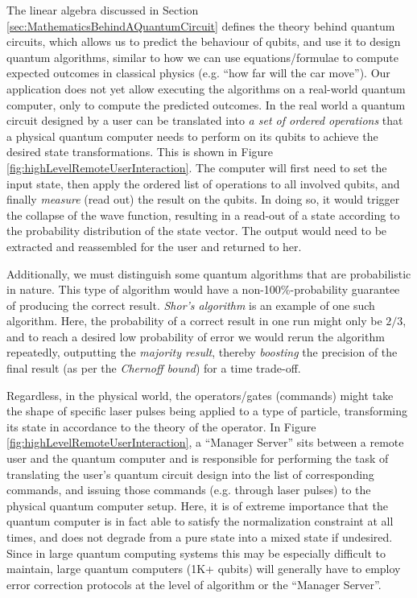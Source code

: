 \documentclass[conference]{IEEEtran}
\begin{document}
The linear algebra discussed in Section \ref{sec:MathematicsBehindAQuantumCircuit} defines the theory behind quantum circuits,
which allows us to predict the behaviour of qubits, and use it to design quantum algorithms,
similar to how we can use equations/formulae to compute expected outcomes in classical physics (e.g. ``how far will the car move'').
Our application does not yet allow executing the algorithms on a real-world quantum computer, only to compute the predicted outcomes.
In the real world a quantum circuit designed by a user can be translated
into \textit{a set of ordered operations} that a physical
quantum computer needs to perform on its qubits to achieve the desired state transformations. This is shown in Figure \ref{fig:highLevelRemoteUserInteraction}.
The computer will first need to set the input state, then apply the ordered list of operations to all involved qubits,
and finally \textit{measure} (read out) the result on the qubits. In doing so, it would trigger the collapse of the wave function,
resulting in a read-out of a state according to the probability distribution of the state vector.
The output would need to be extracted and reassembled for the user and returned to her.

Additionally, we must distinguish some quantum algorithms that are probabilistic in nature.
This type of algorithm would have a non-100\%-probability guarantee of producing the correct result.
\textit{Shor's algorithm} is an example of one such algorithm.
Here, the probability of a correct result in one run might only be $2/3$, and to reach a desired low probability of error
we would rerun the algorithm repeatedly, outputting the \textit{majority result},
thereby \textit{boosting} the precision of the final result (as per the \textit{Chernoff bound}) for a time trade-off.

Regardless, in the physical world, the operators/gates (commands) might take the shape of specific laser pulses being applied to a type of particle,
transforming its state in accordance to the theory of the operator. In Figure \ref{fig:highLevelRemoteUserInteraction},
a ``Manager Server'' sits between a remote user and the quantum computer and is responsible for performing the task of translating the user's
quantum circuit design into the list of corresponding commands, and issuing those commands (e.g. through laser pulses)
to the physical quantum computer setup.
Here, it is of extreme importance that the quantum computer is in fact able to satisfy the normalization constraint at all times,
and does not degrade from a pure state into a mixed state if undesired. Since in large quantum computing systems this may be especially
difficult to maintain, large quantum computers (1K+ qubits) will generally have to employ error correction protocols at
the level of algorithm or the ``Manager Server''.
\end{document}
